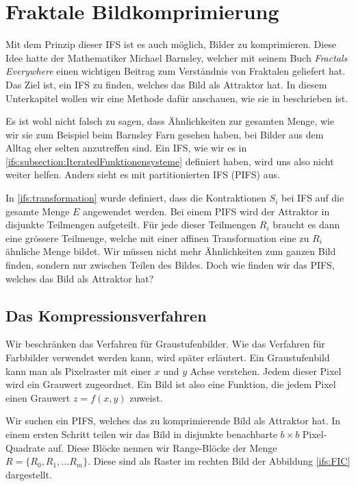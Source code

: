 %
%
%
\section{Fraktale Bildkomprimierung
\label{ifs:section:teil3}}
Mit dem Prinzip dieser IFS ist es auch möglich, Bilder zu komprimieren.
Diese Idee hatte der Mathematiker Michael Barnsley, welcher mit seinem Buch {\em Fractals Everywhere} einen wichtigen Beitrag zum Verständnis von Fraktalen geliefert hat.
Das Ziel ist, ein IFS zu finden, welches das Bild als Attraktor hat.
In diesem Unterkapitel wollen wir eine Methode dafür anschauen, wie sie in \cite{ifs:Rousseau2012} beschrieben ist.

Es ist wohl nicht falsch zu sagen, dass Ähnlichkeiten zur gesamten Menge, wie wir sie zum Beispiel beim Barnsley Farn gesehen haben, bei Bilder aus dem Alltag eher selten anzutreffen sind.
Ein IFS, wie wir es in \ref{ifs:subsection:IteratedFunktionensysteme} definiert haben, wird uns also nicht weiter helfen.
Anders sieht es mit partitionierten IFS (PIFS) \cite{ifs:pifs} aus.

In \ref{ifs:transformation} wurde definiert, dass die Kontraktionen $S_i$ bei IFS auf die gesamte Menge $E$ angewendet werden.
Bei einem PIFS wird der Attraktor in disjunkte Teilmengen aufgeteilt. 
Für jede dieser Teilmengen $R_i$ braucht es dann eine grössere Teilmenge, welche mit einer affinen Transformation eine zu $R_i$ ähnliche Menge bildet.
Wir müssen nicht mehr Ähnlichkeiten zum ganzen Bild finden, sondern nur zwischen Teilen des Bildes.
Doch wie finden wir das PIFS, welches das Bild als Attraktor hat?

\subsection{Das Kompressionsverfahren
\label{ifs:subsection:malorum}}
Wir beschränken das Verfahren für Graustufenbilder. Wie das Verfahren für Farbbilder verwendet werden kann, wird später erläutert.
Ein Graustufenbild kann man als Pixelraster mit einer $x$ und $y$ Achse verstehen.
Jedem dieser Pixel wird ein Grauwert zugeordnet.
Ein Bild ist also eine Funktion, die jedem Pixel einen Grauwert \(z = f(x,y)\) zuweist.

Wir suchen ein PIFS, welches das zu komprimierende Bild als Attraktor hat.
In einem ersten Schritt teilen wir das Bild in disjunkte benachbarte $b \times b$ Pixel-Quadrate auf. Diese Blöcke nennen wir Range-Blöcke der Menge $R=\{R_0,R_1,...R_m\}$. Diese sind als Raster im rechten Bild der Abbildung \ref{ifs:FIC} dargestellt.

